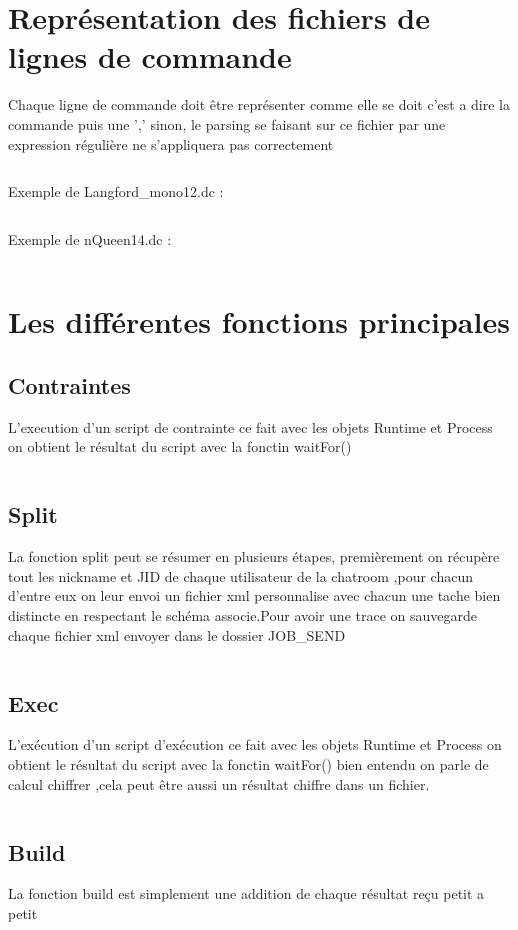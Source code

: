 \documentclass[11pt]{report}
\begin{document}
\inputminted{XML}{../Schema_XML/BDD_JOB.xsd}
\newpage 

\section{Représentation des fichiers de lignes de commande} 
Chaque ligne de commande doit être représenter comme elle se doit c'est a dire la commande puis une ',' sinon, le parsing se faisant sur ce fichier par une expression régulière ne s\textquoteright appliquera pas correctement  
\inputminted{perl}{../Echantillon_Script_Cmd/Toto.dc}
Exemple de Langford\_mono12.dc :
\inputminted{perl}{../Echantillon_Script_Cmd/Langford_mono12.dc}
Exemple de nQueen14.dc :
\inputminted{perl}{../Echantillon_Script_Cmd/nQuenn14.dc}
\newpage
\section{Les différentes fonctions principales}

\subsection{Contraintes} 
L'execution d'un script de contrainte ce fait avec les objets Runtime et Process on obtient le résultat du script avec la fonctin waitFor() 
\inputminted{perl}{../Echantillon_Script_Perl/OSname.pl}
\newpage
\subsection{Split} 
La fonction split peut se résumer en plusieurs étapes, premièrement on récupère tout les nickname et JID de chaque utilisateur de la chatroom ,pour chacun d'entre eux on leur envoi un fichier xml personnalise avec chacun une tache bien distincte en respectant le schéma associe.Pour avoir une trace on sauvegarde chaque fichier xml envoyer dans le dossier JOB\_SEND
\inputminted[tabsize=2,frame=lines,linenos]{java}{Fichier_import/split.java}
\subsection{Exec} 
L\textquoteright exécution d'un script d’exécution ce fait avec les objets Runtime et Process on obtient le résultat du script avec la fonctin waitFor() bien entendu on parle de calcul chiffrer ,cela peut être aussi un résultat chiffre dans un fichier. 
\inputminted[tabsize=2,frame=lines,linenos]{Perl}{Fichier_import/calcul.pl}
\newpage
\subsection{Build} 
La fonction build est simplement une addition de chaque résultat reçu petit a petit 
\inputminted[tabsize=2,frame=lines,linenos]{java}{Fichier_import/build.java}
\newpage
\end{document}
